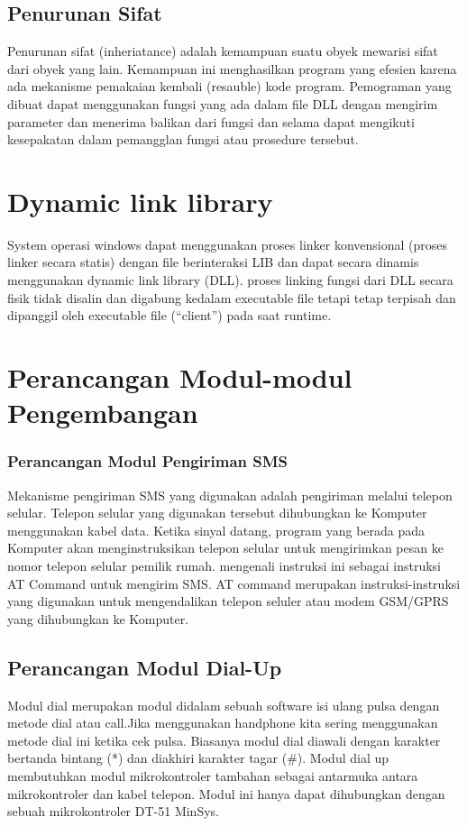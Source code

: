 \documentclass[12pt,a4paper]{article}
\begin{document}
\subsection{Penurunan Sifat}
Penurunan sifat (inheriatance) adalah kemampuan suatu obyek mewarisi sifat dari obyek yang lain. Kemampuan ini menghasilkan program yang efesien karena ada mekanisme pemakaian kembali (resauble) kode program. Pemograman yang dibuat dapat menggunakan fungsi yang ada dalam file DLL dengan mengirim parameter dan menerima balikan dari fungsi dan selama dapat mengikuti kesepakatan dalam pemangglan fungsi atau prosedure tersebut.


\section{Dynamic link library}
System operasi windows dapat menggunakan proses linker konvensional (proses linker secara statis) dengan file berinteraksi LIB dan dapat secara dinamis menggunakan dynamic link library (DLL).
proses linking fungsi dari DLL secara fisik tidak disalin dan digabung kedalam executable file tetapi tetap terpisah dan dipanggil oleh executable file (“client”) pada saat runtime.

\section{Perancangan Modul-modul Pengembangan}
\subsubsection{Perancangan Modul Pengiriman SMS}
Mekanisme pengiriman SMS yang digunakan adalah pengiriman melalui telepon selular. Telepon selular yang digunakan tersebut dihubungkan ke Komputer menggunakan kabel data. Ketika sinyal datang, program yang berada pada Komputer akan menginstruksikan telepon selular untuk mengirimkan pesan ke nomor telepon selular pemilik rumah.
mengenali instruksi ini sebagai instruksi AT Command untuk mengirim SMS. AT command merupakan instruksi-instruksi yang digunakan untuk mengendalikan telepon seluler atau modem GSM/GPRS yang dihubungkan ke Komputer.
\subsection{Perancangan Modul Dial-Up}
Modul dial merupakan modul didalam sebuah software isi ulang pulsa dengan metode dial atau call.Jika menggunakan handphone kita sering menggunakan metode dial ini ketika cek pulsa. Biasanya modul dial diawali dengan karakter bertanda bintang (*) 
dan diakhiri karakter tagar (#).  Modul dial up membutuhkan modul mikrokontroler tambahan 
sebagai antarmuka antara mikrokontroler dan kabel telepon. Modul ini hanya dapat dihubungkan dengan 
sebuah mikrokontroler DT-51 MinSys.
\end{document}
